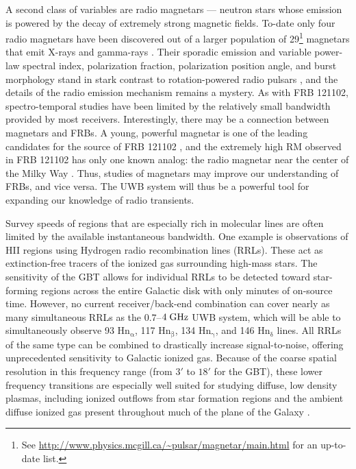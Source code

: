 \documentclass[10pt]{myNSF}
\begin{document}
A second class of variables are radio magnetars --- neutron stars
whose emission is powered by the decay of extremely strong magnetic
fields.  To-date only four radio magnetars have been discovered out of
a larger population of 29\footnote{See
  \url{http://www.physics.mcgill.ca/~pulsar/magnetar/main.html} for an
  up-to-date list.} magnetars that emit X-rays and gamma-rays
\citep{crh+06,crh+07,lbb+10,efk+13}.  Their sporadic emission and
variable power-law spectral index, polarization fraction, polarization
position angle, and burst morphology stand in stark contrast to
rotation-powered radio pulsars \citep[e.g.][]{crp+07}, and the details
of the radio emission mechanism remains a mystery.  As with FRB
121102, spectro-temporal studies have been limited by the relatively
small bandwidth provided by most receivers.  Interestingly, there may
be a connection between magnetars and FRBs.  A young, powerful
magnetar is one of the leading candidates for the source of FRB 121102
\citep[e.g.][]{mm18}, and the extremely high RM observed in FRB 121102
has only one known analog: the radio magnetar near the center of the
Milky Way \citep{efk+13}.  Thus, studies of magnetars may improve our
understanding of FRBs, and vice versa.  The UWB system will thus be a
powerful tool for expanding our knowledge of radio transients.

 Survey speeds of regions that are
especially rich in molecular lines are often limited by the available
instantaneous bandwidth.  One example is observations of H{\sc II}
regions using Hydrogen radio recombination lines (RRLs).  These act as
extinction-free tracers of the ionized gas surrounding high-mass
stars.  The sensitivity of the GBT allows for individual RRLs to be
detected toward star-forming regions across the entire Galactic disk
with only minutes of on-source time.  However, no current
receiver/back-end combination can cover nearly as many simultaneous
RRLs as the $0.7$--$4\; \textrm{GHz}$ UWB system, which will be able to
simultaneously observe 93 $\mathrm{Hn_\alpha}$, 117
$\mathrm{Hn_\beta}$, 134 $\mathrm{Hn_\gamma}$, and 146
$\mathrm{Hn_\delta}$ lines. All RRLs of the same type can be combined
to drastically increase signal-to-noise, offering unprecedented
sensitivity to Galactic ionized gas.  Because of the coarse spatial
resolution in this frequency range (from $3'$ to $18'$ for the GBT),
these lower frequency transitions are especially well suited for
studying diffuse, low density plasmas, including ionized outflows from
star formation regions and the ambient diffuse ionized gas present
throughout much of the plane of the Galaxy \cite{lab+17}.
\end{document}
